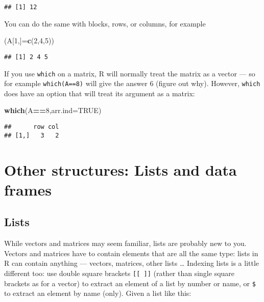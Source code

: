 \documentclass[11pt,]{article}
\newenvironment{Shaded}{\begin{snugshade}}{\end{snugshade}}
\newcommand{\KeywordTok}[1]{\textcolor[rgb]{0.13,0.29,0.53}{\textbf{#1}}}
\newcommand{\DataTypeTok}[1]{\textcolor[rgb]{0.13,0.29,0.53}{#1}}
\newcommand{\DecValTok}[1]{\textcolor[rgb]{0.00,0.00,0.81}{#1}}
\newcommand{\OtherTok}[1]{\textcolor[rgb]{0.56,0.35,0.01}{#1}}
\newcommand{\OperatorTok}[1]{\textcolor[rgb]{0.81,0.36,0.00}{\textbf{#1}}}
\newcommand{\NormalTok}[1]{#1}
\begin{document}
\begin{verbatim}
## [1] 12
\end{verbatim}

You can do the same with blocks, rows, or columns, for example

\begin{Shaded}
\begin{Highlighting}[]
\NormalTok{(A[}\DecValTok{1}\NormalTok{,]=}\KeywordTok{c}\NormalTok{(}\DecValTok{2}\NormalTok{,}\DecValTok{4}\NormalTok{,}\DecValTok{5}\NormalTok{))}
\end{Highlighting}
\end{Shaded}

\begin{verbatim}
## [1] 2 4 5
\end{verbatim}

If you use \texttt{which} on a matrix, R will normally treat the matrix
as a vector --- so for example \texttt{which(A==8)} will give the answer
6 (figure out why). However, \texttt{which} does have an option that
will treat its argument as a matrix:

\begin{Shaded}
\begin{Highlighting}[]
\KeywordTok{which}\NormalTok{(A}\OperatorTok{==}\DecValTok{8}\NormalTok{,}\DataTypeTok{arr.ind=}\OtherTok{TRUE}\NormalTok{)}
\end{Highlighting}
\end{Shaded}

\begin{verbatim}
##      row col
## [1,]   3   2
\end{verbatim}

\section{Other structures: Lists and data
frames}\label{other-structures-lists-and-data-frames}

\subsection{Lists}\label{lists}

While vectors and matrices may seem familiar, lists are probably new to
you. Vectors and matrices have to contain elements that are all the same
type: lists in R can contain anything --- vectors, matrices, other lists
\ldots{} Indexing lists is a little different too: use double square
brackets \texttt{{[}{[}\ {]}{]}} (rather than single square brackets as
for a vector) to extract an element of a list by number or name, or
\texttt{\$} to extract an element by name (only). Given a list like
this:
\end{document}
